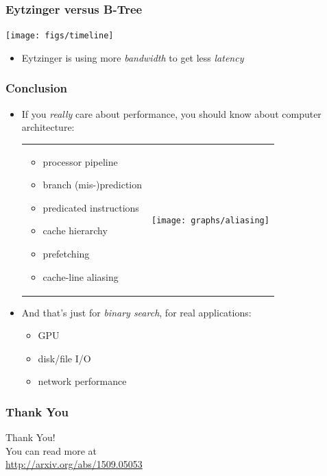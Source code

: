 \documentclass[xcolor=dvipsnames]{beamer}
\begin{document}
\begin{frame}
  \frametitle{Eytzinger versus B-Tree}

  \begin{center}
    \texttt{[image: figs/timeline]}
  \end{center}
  \vspace{-1em}
  \begin{itemize}[<2->]
     \item Eytzinger is using more \emph{bandwidth} to get less \emph{latency} 
  \end{itemize}
\end{frame}


\begin{frame}
  \frametitle{Conclusion}

  \begin{itemize}[<+->]
    \item If you \emph{really} care about performance, you should know
       about computer architecture:
  \begin{tabular}{@{}m{}m{}}
    \begin{itemize}[<+->]
     \item processor pipeline
     \item branch (mis-)prediction
     \item predicated instructions
     \item cache hierarchy
     \item prefetching
     \item cache-line aliasing 
    \end{itemize}
    &
    \texttt{[image: graphs/aliasing]}
  \end{tabular}
  \item And that's just for \emph{binary search}, for real applications:
    \begin{itemize}[<+->]
     \item GPU
     \item disk/file I/O
     \item network performance
    \end{itemize}
  \end{itemize}
\end{frame}


\begin{frame}
   \frametitle{Thank You}


   \begin{center}
   {\Huge Thank You!} \\ [1em]
   You can read more at\\ \url{http://arxiv.org/abs/1509.05053}
   \end{center}
   

\end{frame}
\end{document}

